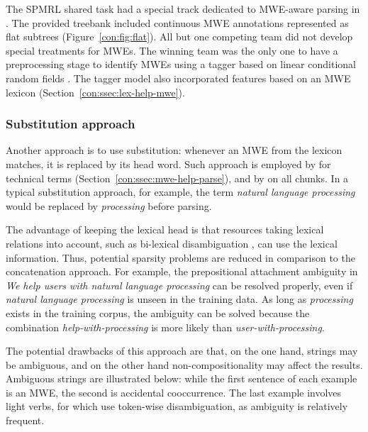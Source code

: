 \documentclass[output=paper]{langsci/langscibook}
\begin{document}
The SPMRL shared task \citep{seddah13} had a special track dedicated to MWE-aware parsing in . The provided treebank included continuous MWE annotations represented as flat subtrees (Figure~\ref{con:fig:flat}). All but one competing team did not develop special treatments for MWEs. The winning team was the only one to have a preprocessing stage to identify MWEs using a tagger based on linear conditional random fields \citep{constant13mwe}. The tagger model also incorporated features based on an MWE lexicon (Section~\ref{con:ssec:lex-help-mwe}).

\subsubsection{Substitution approach}
\label{con:ssec:subst}


Another approach is to use substitution: whenever an MWE from the lexicon 
matches, it is replaced by its head word. Such approach is employed by \cite{weeds-ea07} for technical terms (Section~\ref{con:ssec:mwe-help-parse}), and by \citet{schneiderphd} on all chunks.
In a typical substitution approach, for example, the term \textit{natural language processing} would be replaced by \textit{processing} before parsing. 

The advantage of keeping the lexical head is that resources taking lexical relations into account, such as bi-lexical disambiguation \citep{collins99}, can use the lexical information. Thus, potential sparsity problems are reduced in comparison to the concatenation approach. For example, the prepositional  attachment ambiguity in 
\textit{We help users with natural language processing} 
can be resolved properly, even if \textit{natural language processing} is unseen in the training data. As long as \textit{processing} exists in the training corpus, the ambiguity can be solved because the combination \textit{help-with-processing} is more likely than \textit{user-with-processing}. 

The potential drawbacks of this approach are that, on the one hand, strings may be ambiguous, and on the other hand non-compositionality may affect the results. 
Ambiguous strings are illustrated below: while the first sentence of each example is an MWE, the second is accidental cooccurrence. The last example involves light verbs, for which \citet{tu-roth:2011:mwe} use token-wise disambiguation, as ambiguity is relatively frequent. 
\end{document}
